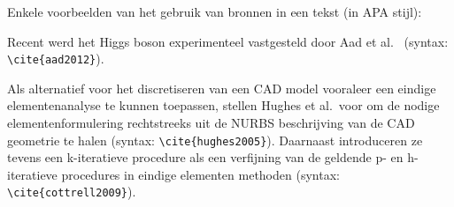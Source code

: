 Enkele voorbeelden van het gebruik van bronnen in een tekst (in APA stijl):

Recent werd het Higgs boson experimenteel vastgesteld door Aad et al.\ \cite{aad2012} (syntax: \verb|\cite{aad2012}|).

Als alternatief voor het discretiseren van een CAD model vooraleer een eindige elementenanalyse te kunnen toepassen, stellen Hughes et al.\ voor om de nodige elementenformulering rechtstreeks uit de NURBS beschrijving van de CAD geometrie te halen \cite{hughes2005} (syntax: \verb|\cite{hughes2005}|). Daarnaast introduceren ze tevens een k-iteratieve procedure als een verfijning van de geldende p- en h-iteratieve procedures in eindige elementen methoden \cite{cottrell2009} (syntax: \verb|\cite{cottrell2009}|).
